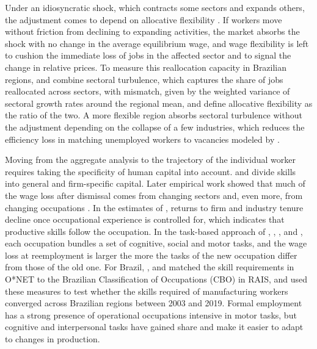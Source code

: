 \documentclass[11pt,a4paper]{article}
\let\citetorig\citet
\let\citeporig\citep
\renewcommand{\citet}[1]{{\color{citeblue}\citetorig{#1}}}
\renewcommand{\citep}[1]{{\color{citeblue}\citeporig{#1}}}
\begin{document}
Under an idiosyncratic shock, which contracts some sectors and expands others, the adjustment comes to depend on allocative flexibility \citep{barros1997ppp}. If workers move without friction from declining to expanding activities, the market absorbs the shock with no change in the average equilibrium wage, and wage flexibility is left to cushion the immediate loss of jobs in the affected sector and to signal the change in relative prices. To measure this reallocation capacity in Brazilian regions, \citet{barros1997ppp} and \citet{staduto2010} combine sectoral turbulence, which captures the share of jobs reallocated across sectors, with mismatch, given by the weighted variance of sectoral growth rates around the regional mean, and define allocative flexibility as the ratio of the two. A more flexible region absorbs sectoral turbulence without the adjustment depending on the collapse of a few industries, which reduces the efficiency loss in matching unemployed workers to vacancies modeled by \citet{sahin2014}.

Moving from the aggregate analysis to the trajectory of the individual worker requires taking the specificity of human capital into account. \citet{becker1962} and \citet{topel1991} divide skills into general and firm-specific capital. Later empirical work showed that much of the wage loss after dismissal comes from changing sectors \citep{neal1995, parent2000} and, even more, from changing occupations \citep{kambourov2009, sullivan2010}. In the estimates of \citet{kambourov2009}, returns to firm and industry tenure decline once occupational experience is controlled for, which indicates that productive skills follow the occupation. In the task-based approach of \citet{autor2003}, \citet{poletaev2008}, \citet{gathmann2010}, \citet{autor2013} and \citet{deming2017}, each occupation bundles a set of cognitive, social and motor tasks, and the wage loss at reemployment is larger the more the tasks of the new occupation differ from those of the old one. For Brazil, \citet{maciente2013}, \citet{maciente2019} and \citet{junior2021} matched the skill requirements in O*NET to the Brazilian Classification of Occupations (CBO) in RAIS, and \citet{castro2023} used these measures to test whether the skills required of manufacturing workers converged across Brazilian regions between 2003 and 2019. Formal employment has a strong presence of operational occupations intensive in motor tasks, but cognitive and interpersonal tasks have gained share and make it easier to adapt to changes in production.
\end{document}
